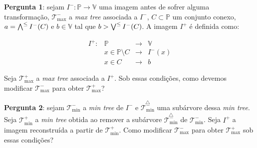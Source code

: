 \textbf{Pergunta 1}: sejam $I^{-}: \mathbb{P} \rightarrow \mathbb{V}$ uma imagem antes de sofrer
alguma transformação, $\mathscr{T}^{-}_{\text{max}}$ a \textit{max tree} associada a $I^{-}$,
$C \subset \mathbb{P}$ um conjunto conexo, $a = \bigwedge^{\le}I^{-}(C)$ e
$b \in \mathbb{V}$ tal que $b > \bigvee^{\le}I^{-}(C)$.
A imagem $I^{+}$ é definida como:

$$\begin{array}{|llll}
   I^{+} : & \mathbb{P} & \rightarrow & \mathbb{V}  \\
           & x \in \mathbb{P} \setminus C & \rightarrow & I^{-}(x) \\
           & x \in C & \rightarrow & b
\end{array}$$

Seja $\mathscr{T}_{\text{max}}^{+}$ a \textit{max tree} associada a $I^{+}$.
Sob essas condições, como devemos modificar $\mathscr{T}_{\text{max}}^{-}$
para obter $\mathscr{T}_{\text{max}}^{+}$?

\textbf{Pergunta 2}: sejam $\mathscr{T}_{\text{min}}^{-}$ a \textit{min tree} de $I^{-}$
 e $\overset{\triangle}{\mathscr{T}_{\text{min}}^{-}}$ uma subárvore
 dessa \textit{min tree}. Seja $\mathscr{T}_{\text{min}}^{+}$
 a \textit{min tree} obtida ao remover a subárvore $\overset{\triangle}{\mathscr{T}_{\text{min}}^{-}}$
 de $\mathscr{T}_{\text{min}}^{-}$. Seja $I^{+}$ a imagem reconstruída
 a partir de $\mathscr{T}_{\text{min}}^{+}$. Como modificar
 $\mathscr{T}_{\text{max}}^{-}$ para obter $\mathscr{T}_{\text{max}}^{+}$ sob
 essas condições?
 
